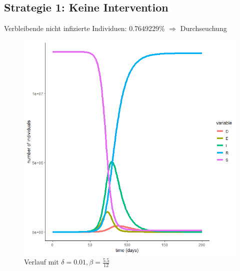 \documentclass{scrartcl}
\begin{document}
\subsection{Strategie 1: Keine Intervention}
	Verbleibende nicht infizierte Individuen: 0.7649229\% $\Rightarrow$ Durchseuchung
	\begin{figure}[h]
        	\centering
		\includegraphics[scale=0.5]{delta=0,01,beta_unveraendert,alles.png}
		\caption{Verlauf mit $\delta = 0.01, \beta = \frac{5.5}{12}$}
	\end{figure}
\end{document}
